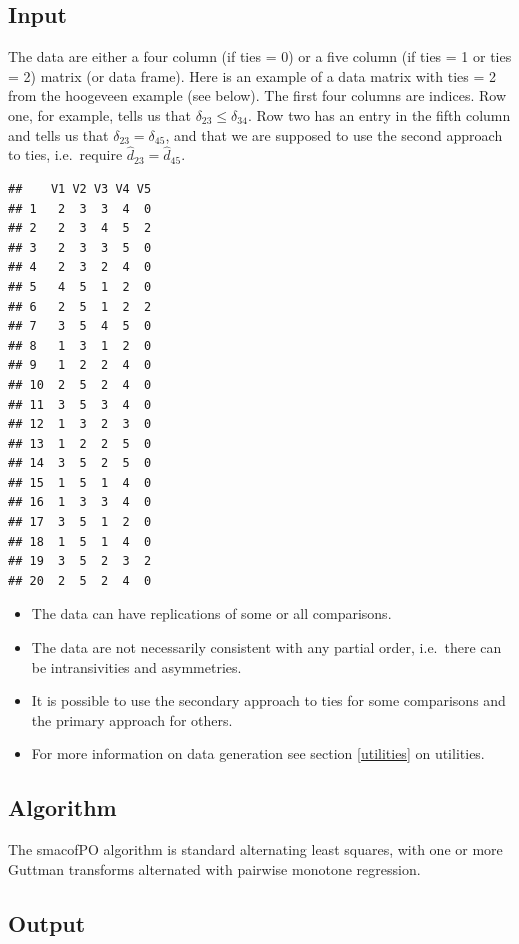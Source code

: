 \documentclass[
  12pt,
]{article}
\providecommand{\tightlist}{%
  \setlength{\itemsep}{0pt}\setlength{\parskip}{0pt}}
\begin{document}
\subsection{Input}\label{input}

The data are either a four column (if ties = 0) or a five column (if ties = 1
or ties = 2) matrix (or data frame). Here is an example of a data matrix
with ties = 2 from the hoogeveen example (see below). The first four columns are indices. Row one, for example,
tells us that \(\delta_{23}\leq\delta_{34}\). Row two has an entry in the
fifth column and tells us that \(\delta_{23}=\delta_{45}\), and that we
are supposed to use the second approach to ties, i.e.~require
\(\hat d_{23}=\hat d_{45}\).

\begin{verbatim}
##    V1 V2 V3 V4 V5
## 1   2  3  3  4  0
## 2   2  3  4  5  2
## 3   2  3  3  5  0
## 4   2  3  2  4  0
## 5   4  5  1  2  0
## 6   2  5  1  2  2
## 7   3  5  4  5  0
## 8   1  3  1  2  0
## 9   1  2  2  4  0
## 10  2  5  2  4  0
## 11  3  5  3  4  0
## 12  1  3  2  3  0
## 13  1  2  2  5  0
## 14  3  5  2  5  0
## 15  1  5  1  4  0
## 16  1  3  3  4  0
## 17  3  5  1  2  0
## 18  1  5  1  4  0
## 19  3  5  2  3  2
## 20  2  5  2  4  0
\end{verbatim}

\begin{itemize}
\tightlist
\item
  The data can have replications of some or all comparisons.
\item
  The data are not necessarily consistent with any partial order, i.e.~there can be intransivities and asymmetries.
\item
  It is possible to use the secondary approach to ties for some comparisons
  and the primary approach for others.
\item
  For more information on data generation see section \ref{utilities} on utilities.
\end{itemize}

\subsection{Algorithm}\label{algorithm}

The smacofPO algorithm is standard alternating least squares, with one or
more Guttman transforms alternated with pairwise monotone regression.

\subsection{Output}\label{output}
\end{document}
